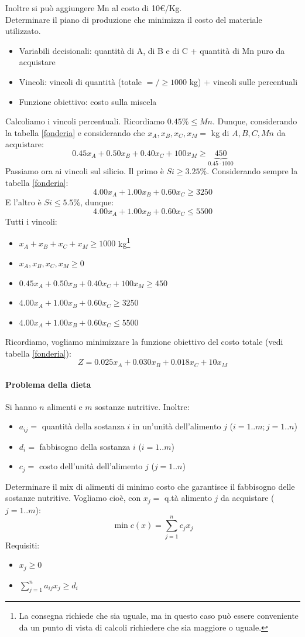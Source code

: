 \documentclass[12pt]{extarticle} %
\begin{document}
\noindent Inoltre si può aggiungere Mn al costo di 10€/Kg.\\
Determinare il piano di produzione che minimizza il costo del materiale utilizzato.
\begin{itemize}
    \item Variabili decisionali: quantità di A, di B e di C + quantità di Mn puro da acquistare
    \item Vincoli: vincoli di quantità (totale $=/\ge 1000$ kg) + vincoli sulle percentuali
    \item Funzione obiettivo: costo sulla miscela
\end{itemize}
Calcoliamo i vincoli percentuali. Ricordiamo $0.45\% \le \textit{Mn}$. Dunque, considerando la tabella \ref{fonderia} e considerando che $x_A,x_B,x_C,x_M = $ kg di $A,B,C,\textit{Mn}$ da acquistare:
\[
0.45x_A + 0.50x_B + 0.40x_C + 100x_M \ge \underbrace{450}_{0.45\cdot 1000}
\]
Passiamo ora ai vincoli sul silicio. Il primo è $\textit{Si} \ge 3.25\%$. Considerando sempre la tabella \ref{fonderia}:
\[
4.00x_A + 1.00x_B + 0.60x_C \ge 3250
\]
E l'altro è $\textit{Si} \le 5.5\%$, dunque:
\[
4.00x_A + 1.00x_B + 0.60x_C \le 5500
\]
Tutti i vincoli:
\begin{itemize}
    \item $x_A + x_B+x_C + x_M \ge 1000$ kg\footnote{La consegna richiede che sia uguale, ma in questo caso può essere conveniente da un punto di vista di calcoli richiedere che sia maggiore o uguale.}
    \item $x_A,x_B,x_C,x_M \ge 0$
    \item $0.45x_A + 0.50x_B + 0.40x_C + 100x_M \ge 450$
    \item $4.00x_A + 1.00x_B + 0.60x_C \ge 3250$
    \item $4.00x_A + 1.00x_B + 0.60x_C \le 5500$
\end{itemize}
Ricordiamo, vogliamo minimizzare la funzione obiettivo del costo totale (vedi tabella \ref{fonderia}):
\[
Z = 0.025x_A + 0.030x_B + 0.018x_C + 10x_M
\]

\paragraph{Problema della dieta} Si hanno $n$ alimenti e $m$ sostanze nutritive. Inoltre:
\begin{itemize}
    \item $a_{ij} = $ quantità della sostanza $i$ in un'unità dell'alimento $j$ ($i=1..m; j=1..n$)
    \item $d_i = $ fabbisogno della sostanza $i$ ($i=1..m$)
    \item $c_j = $ costo dell'unità dell'alimento $j$ ($j=1..n$)
\end{itemize}
Determinare il mix di alimenti di minimo costo che garantisce il fabbisogno delle sostanze nutritive. Vogliamo cioè, con $x_j = $ q.tà alimento $j$ da acquistare ($j=1..m$):
\[
\min c(x) = \sum_{j=1}^n c_jx_j
\]
Requisiti:
\begin{itemize}
    \item $x_j \ge 0$
    \item $\sum_{j=1}^n a_{ij}x_j \ge d_i$
\end{itemize}
\end{document}
